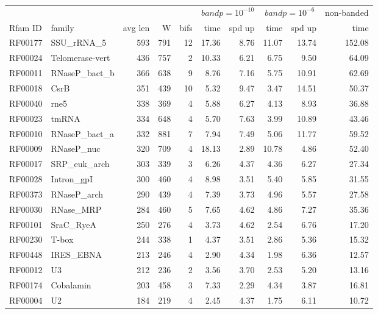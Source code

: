 \documentclass[11pt]{article}
\newif\ifdraft
\begin{document}
\ifdraft
\begin{table}
\scriptsize
\begin{center}
\begin{tabular}{|ll|rrr|rr|rr|r|} \cline{6-10}
\multicolumn{5}{c}{} & \multicolumn{2}{|c|}{$bandp = 10^{-10}$} &
  \multicolumn{2}{c|}{$bandp = 10^{-6}$} & \multicolumn{1}{c|}{non-banded} \\ \cline{1-5}
Rfam ID & family & avg len & W & bifs & time & spd up & time & spd up & time \\ \hline 
RF00177 & SSU\_rRNA\_5 & 593 & 791 & 12 & 17.36 & 8.76 & 11.07 & 13.74 & 152.08 \\  
RF00024 & Telomerase-vert & 436 & 757 & 2 & 10.33 & 6.21 & 6.75 & 9.50 & 64.09 \\  
RF00011 & RNaseP\_bact\_b & 366 & 638 & 9 & 8.76 & 7.16 & 5.75 & 10.91 & 62.69 \\  
RF00018 & CsrB & 351 & 439 & 10 & 5.32 & 9.47 & 3.47 & 14.51 & 50.37 \\  
RF00040 & rne5 & 338 & 369 & 4 & 5.88 & 6.27 & 4.13 & 8.93 & 36.88 \\  
RF00023 & tmRNA & 334 & 648 & 4 & 5.70 & 7.63 & 3.99 & 10.89 & 43.46 \\  
RF00010 & RNaseP\_bact\_a & 332 & 881 & 7 & 7.94 & 7.49 & 5.06 & 11.77 & 59.52 \\  
RF00009 & RNaseP\_nuc & 320 & 709 & 4 & 18.13 & 2.89 & 10.78 & 4.86 & 52.40 \\  
RF00017 & SRP\_euk\_arch & 303 & 339 & 3 & 6.26 & 4.37 & 4.36 & 6.27 & 27.34 \\  
RF00028 & Intron\_gpI & 300 & 460 & 4 & 8.98 & 3.51 & 5.40 & 5.85 & 31.55 \\  
RF00373 & RNaseP\_arch & 290 & 439 & 4 & 7.39 & 3.73 & 4.96 & 5.57 & 27.58 \\  
RF00030 & RNase\_MRP & 284 & 460 & 5 & 7.65 & 4.62 & 4.86 & 7.27 & 35.36 \\  
RF00101 & SraC\_RyeA & 250 & 276 & 4 & 3.73 & 4.62 & 2.54 & 6.76 & 17.20 \\  
RF00230 & T-box & 244 & 338 & 1 & 4.37 & 3.51 & 2.86 & 5.36 & 15.32 \\  
RF00448 & IRES\_EBNA & 213 & 246 & 4 & 2.90 & 4.34 & 1.98 & 6.36 & 12.57 \\  
RF00012 & U3 & 212 & 236 & 2 & 3.56 & 3.70 & 2.53 & 5.20 & 13.16 \\  
RF00174 & Cobalamin & 203 & 458 & 3 & 7.33 & 2.29 & 4.34 & 3.87 & 16.81 \\  
RF00004 & U2 & 184 & 219 & 4 & 2.45 & 4.37 & 1.75 & 6.11 & 10.72 \\  

\end{tabular}
\end{center}
\end{table}
\end{document}
